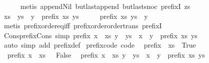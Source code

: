 \begin{isabellebody}
\ \ \ \ \isamarkupfalse%
\ {\isacharparenleft}metis\ append{\isacharunderscore}Nil{}\ butlast{\isacharunderscore}append\ butlast{\isacharunderscore}snoc\ prefixI\ zs{\isacharparenright}\isanewline
{}\isamarkupfalse%
\isanewline
\ \ \isamarkupfalse%
\ {\isachardoublequoteopen}xs\ {\isacharequal}\ ys\ {\isacharat}\ {\isacharbrackleft}y{\isacharbrackright}\ {\isasymor}\ prefix\ xs\ ys{\isachardoublequoteclose}\isanewline
\ \ \isamarkupfalse%
\ \isamarkupfalse%
\ {\isachardoublequoteopen}prefix\ xs\ {\isacharparenleft}ys\ {\isacharat}\ {\isacharbrackleft}y{\isacharbrackright}{\isacharparenright}{\isachardoublequoteclose}\isanewline
\ \ \ \ \isamarkupfalse%
\ {\isacharparenleft}metis\ prefix{\isacharunderscore}order{\isachardot}eq{\isacharunderscore}iff\ prefix{\isacharunderscore}order{\isachardot}order{\isacharunderscore}trans\ prefixI{\isacharparenright}\isanewline
{}\isamarkupfalse%
%
\endisatagproof
{\isafoldproof}%
%
\isadelimproof
\isanewline
%
\endisadelimproof
\isanewline
{}\isamarkupfalse%
\ Cons{\isacharunderscore}prefix{\isacharunderscore}Cons\ {\isacharbrackleft}simp{\isacharbrackright}{\isacharcolon}\ {\isachardoublequoteopen}prefix\ {\isacharparenleft}x\ {\isacharhash}\ xs{\isacharparenright}\ {\isacharparenleft}y\ {\isacharhash}\ ys{\isacharparenright}\ {\isacharequal}\ {\isacharparenleft}x\ {\isacharequal}\ y\ {\isasymand}\ prefix\ xs\ ys{\isacharparenright}{\isachardoublequoteclose}\isanewline
%
\isadelimproof
\ \ %
\endisadelimproof
%
\isatagproof
{}\isamarkupfalse%
\ {\isacharparenleft}auto\ simp\ add{\isacharcolon}\ prefix{\isacharunderscore}def{\isacharparenright}%
\endisatagproof
{\isafoldproof}%
%
\isadelimproof
\isanewline
%
\endisadelimproof
\isanewline
{}\isamarkupfalse%
\ prefix{\isacharunderscore}code\ {\isacharbrackleft}code{\isacharbrackright}{\isacharcolon}\isanewline
\ \ {\isachardoublequoteopen}prefix\ {\isacharbrackleft}{\isacharbrackright}\ xs\ {\isasymlongleftrightarrow}\ True{\isachardoublequoteclose}\isanewline
\ \ {\isachardoublequoteopen}prefix\ {\isacharparenleft}x\ {\isacharhash}\ xs{\isacharparenright}\ {\isacharbrackleft}{\isacharbrackright}\ {\isasymlongleftrightarrow}\ False{\isachardoublequoteclose}\isanewline
\ \ {\isachardoublequoteopen}prefix\ {\isacharparenleft}x\ {\isacharhash}\ xs{\isacharparenright}\ {\isacharparenleft}y\ {\isacharhash}\ ys{\isacharparenright}\ {\isasymlongleftrightarrow}\ x\ {\isacharequal}\ y\ {\isasymand}\ prefix\ xs\ ys{\isachardoublequoteclose}\isanewline

\end{isabellebody}
